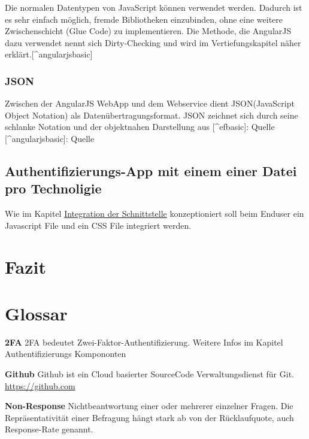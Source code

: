 Die normalen Datentypen von JavaScript können verwendet werden. Dadurch
ist es sehr einfach möglich, fremde Bibliotheken einzubinden, ohne eine
weitere Zwischenschicht (Glue Code) zu implementieren. Die Methode, die
AngularJS dazu verwendet nennt sich Dirty-Checking und wird im
Vertiefungskapitel näher erklärt.{[}\^{}angularjsbasic{]}

\subsection{JSON}\label{json}

Zwischen der AngularJS WebApp und dem Webservice dient JSON(JavaScript
Object Notation) als Datenübertragungsformat. JSON zeichnet sich durch
seine schlanke Notation und der objektnahen Darstellung aus
{[}\^{}efbasic{]}: Quelle \autocite{efbasic} {[}\^{}angularjsbasic{]}:
Quelle \autocite{angularjsbasic}

\section{Authentifizierungs-App mit einem einer Datei pro
Technoligie}\label{authentifizierungs-app-mit-einem-einer-datei-pro-technoligie}

Wie im Kapitel
\protect\hyperlink{integration-der-schnittstelle}{Integration der
Schnittstelle} konzeptioniert soll beim Enduser ein Javascript File und
ein CSS File integriert werden.

\chapter{Fazit}\label{fazit-1}

\newpage

\appendix

\hypertarget{glossar}{\chapter{Glossar}\label{glossar}}

\textbf{2FA} 2FA bedeutet Zwei-Faktor-Authentifizierung. Weitere Infos
im Kapitel Authentifizierungs Kompononten

\textbf{Github} Github ist ein Cloud basierter SourceCode
Verwaltungsdienst für Git. \url{https://github.com}

\textbf{Non-Response} Nichtbeantwortung einer oder mehrerer einzelner
Fragen. Die Repräsentativität einer Befragung hängt stark ab von der
Rücklaufquote, auch Response-Rate genannt.

